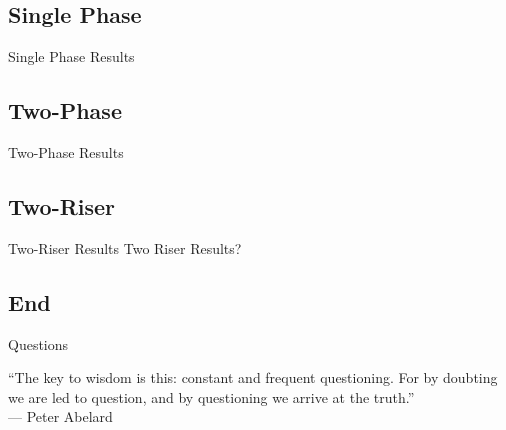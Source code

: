 \documentclass[10pt,t,xcolor=table,compress]{UWMadBeamer}
\begin{document}
    
    \subsection*{Single Phase}
    \begin{frame}{Single Phase Results}
        
    \end{frame}
    \subsection*{Two-Phase}
    \begin{frame}{Two-Phase Results}
        
    \end{frame}
    \subsection*{Two-Riser}
    \begin{frame}{Two-Riser Results}
        Two Riser Results?
    \end{frame}

    \subsection*{End}
    \begin{frame}[c]{Questions}
        \begin{center}
                ``The key to wisdom is this: constant and frequent questioning. 
                  For by doubting we are led to question, and by questioning we arrive at the truth.''\\
                \hfill --- Peter Abelard
        \end{center}
    \end{frame}







\appendix

\end{document}
